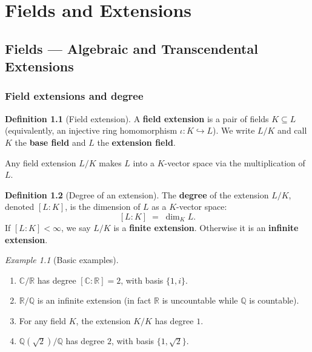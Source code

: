 \documentclass[12pt,a4paper,openany]{book}
\theoremstyle{definition}
\newtheorem{definition}{Definition}[chapter]
\theoremstyle{remark}
\newtheorem{example}{Example}[chapter]
\newcommand{\Q}{\mathbb{Q}}
\newcommand{\R}{\mathbb{R}}
\newcommand{\C}{\mathbb{C}}
\begin{document}
\part{Fields and Extensions}

\chapter{Fields --- Algebraic and Transcendental Extensions}
\label{ch:field-extensions}

\section{Field extensions and degree}
\label{sec:field-ext-degree}

\begin{definition}[Field extension]
\label{def:field-extension}
A \textbf{field extension} is a pair of fields
$K \subseteq L$ (equivalently, an injective ring homomorphism
$\iota\colon K \hookrightarrow L$). We write $L/K$ and call $K$ the
\textbf{base field} and $L$ the \textbf{extension
field}.
\end{definition}

Any field extension $L/K$ makes $L$ into a $K$-vector space via the
multiplication of $L$.

\begin{definition}[Degree of an extension]
\label{def:degree-extension}
The \textbf{degree} of the extension $L/K$, denoted $[L:K]$, is the
dimension of $L$ as a $K$-vector space:
\[
  [L:K] \;=\; \dim_K L.
\]
If $[L:K] < \infty$, we say $L/K$ is a \textbf{finite
extension}. Otherwise it is an
\textbf{infinite extension}.
\end{definition}

\begin{example}[Basic examples]
\label{ex:basic-extensions}
\begin{enumerate}[label=(\roman*)]
  \item $\C/\R$ has degree $[\C:\R] = 2$, with basis $\{1, i\}$.
  \item $\R/\Q$ is an infinite extension (in fact $\R$ is uncountable
    while $\Q$ is countable).
  \item For any field $K$, the extension $K/K$ has degree $1$.
  \item $\Q(\sqrt{2})/\Q$ has degree $2$, with basis $\{1, \sqrt{2}\}$.
\end{enumerate}
\end{example}
\end{document}
